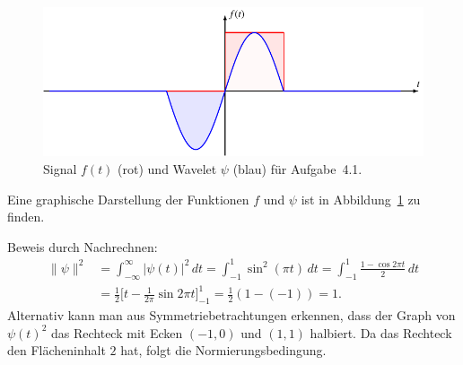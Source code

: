 \begin{loesung}
\begin{figure}
%
\includegraphics{uebungsaufgaben/04001-signal.pdf}
\caption{Signal $f(t)$ (rot) und Wavelet $\psi$ (blau) für Aufgabe~4.1.
\label{04001:funktionen}}
\end{figure}
Eine graphische Darstellung der Funktionen $f$ und $\psi$ ist in
Abbildung~\ref{04001:funktionen} zu finden.
\begin{teilaufgaben}
%
%
\item
Beweis durch Nachrechnen:
\begin{align*}
\|\psi\|^2
&=
\int_{-\infty}^\infty |\psi(t)|^2\,dt
=
\int_{-1}^1 \sin^2(\pi t)\,dt
=
\int_{-1}^1 \frac{1-\cos 2\pi t}{2}\,dt
\\
&=
\frac12\biggl[
t-\frac{1}{2\pi}\sin 2\pi t
\biggr]_{-1}^{1}
=\frac12(1-(-1))
=
1.
\end{align*}
Alternativ kann man aus Symmetriebetrachtungen erkennen, dass der Graph
von $\psi(t)^2$ das Rechteck mit Ecken $(-1,0)$ und $(1,1)$ halbiert.
Da das Rechteck den Flächeninhalt $2$ hat, folgt die Normierungsbedingung.
%

\end{teilaufgaben}
\end{loesung}
